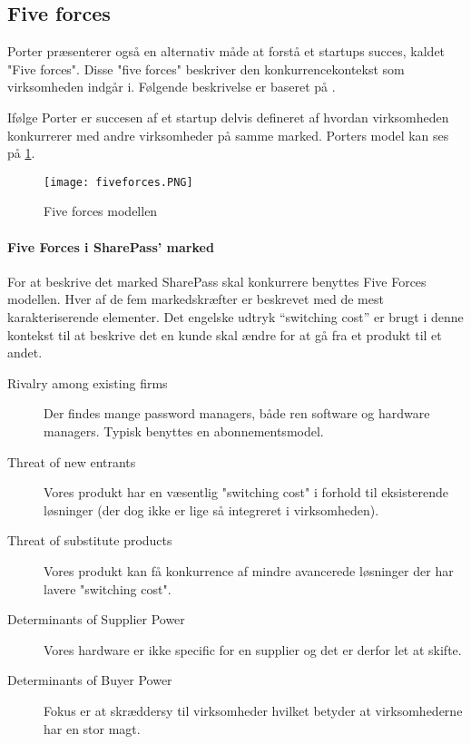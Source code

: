 \subsection{Five forces}
 Porter præsenterer også en alternativ måde at forstå et startups succes, kaldet "Five forces".
 Disse "five forces" beskriver den konkurrencekontekst som virksomheden indgår i.
 Følgende beskrivelse er baseret på \citet[p.~16]{rose2012software}.

 Ifølge Porter er succesen af et startup delvis defineret af hvordan virksomheden konkurrerer med andre virksomheder på samme marked.
 Porters model kan ses på \cref{fiveforces}.

\begin{figure}
	\texttt{[image: fiveforces.PNG]}
	\caption{Five forces modellen}
	\label{fiveforces}
\end{figure}

\paragraph{Five Forces i SharePass' marked}
\label{par:five_forces_i_sharepass_marked}

For at beskrive det marked SharePass skal konkurrere benyttes Five Forces modellen. 
Hver af de fem markedskræfter er beskrevet med de mest karakteriserende elementer.
Det engelske udtryk ``switching cost'' er brugt i denne kontekst til at beskrive det en kunde skal ændre for at gå fra et produkt til et andet.

\begin{description}
	\item[Rivalry among existing firms] Der findes mange password managers, både ren software og hardware managers. Typisk benyttes en abonnementsmodel.
	\item[Threat of new entrants] Vores produkt har en væsentlig "switching cost" i forhold til eksisterende løsninger (der dog ikke er lige så integreret i virksomheden). 
	\item [Threat of substitute products] Vores produkt kan få konkurrence af mindre avancerede løsninger der har lavere "switching cost".
	\item [Determinants of Supplier Power] Vores hardware er ikke specific for en supplier og det er derfor let at skifte. 
	\item [Determinants of Buyer Power] Fokus er at skræddersy til virksomheder hvilket betyder at virksomhederne har en stor magt.
\end{description}
